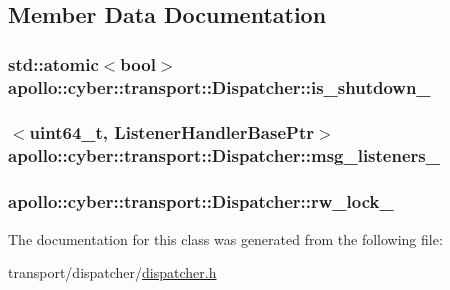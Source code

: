 \subsection{Member Data Documentation}
\hypertarget{classapollo_1_1cyber_1_1transport_1_1Dispatcher_a014ad0d3a3d8830aec03c8a47a00b385}{
\subsubsection[{is\-\_\-shutdown\-\_\-}]{\setlength{\rightskip}{0pt plus 5cm}std\-::atomic$<$bool$>$ apollo\-::cyber\-::transport\-::\-Dispatcher\-::is\-\_\-shutdown\-\_\-\hspace{0.3cm}{\ttfamily [protected]}}}\label{classapollo_1_1cyber_1_1transport_1_1Dispatcher_a014ad0d3a3d8830aec03c8a47a00b385}
\hypertarget{classapollo_1_1cyber_1_1transport_1_1Dispatcher_aec5b13dcc35013468812f0ea0bd0dd89}{
\subsubsection[{msg\-\_\-listeners\-\_\-}]{$<$uint64\-\_\-t, {\bf Listener\-Handler\-Base\-Ptr}$>$ apollo\-::cyber\-::transport\-::\-Dispatcher\-::msg\-\_\-listeners\-\_\-\hspace{0.3cm}{\ttfamily [protected]}}}\label{classapollo_1_1cyber_1_1transport_1_1Dispatcher_aec5b13dcc35013468812f0ea0bd0dd89}
\hypertarget{classapollo_1_1cyber_1_1transport_1_1Dispatcher_a93d037058df25c609f9d2e24f62bd67e}{
\subsubsection[{rw\-\_\-lock\-\_\-}]{ apollo\-::cyber\-::transport\-::\-Dispatcher\-::rw\-\_\-lock\-\_\-\hspace{0.3cm}{\ttfamily [protected]}}}\label{classapollo_1_1cyber_1_1transport_1_1Dispatcher_a93d037058df25c609f9d2e24f62bd67e}


The documentation for this class was generated from the following file\-:\begin{DoxyCompactItemize}
\item 
transport/dispatcher/\hyperlink{dispatcher_8h}{dispatcher.\-h}\end{DoxyCompactItemize}
